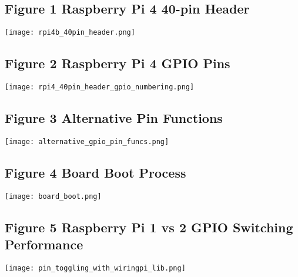\documentclass[journal]{IEEEtran}
\begin{document}
      \subsection{Figure 1 Raspberry Pi 4 40-pin Header}

      \texttt{[image: rpi4b\_40pin\_header.png]}

      \subsection{Figure 2 Raspberry Pi 4 GPIO Pins}

      \texttt{[image: rpi4\_40pin\_header\_gpio\_numbering.png]}

      \subsection{Figure 3 Alternative Pin Functions}

      \texttt{[image: alternative\_gpio\_pin\_funcs.png]}

      \subsection{Figure 4 Board Boot Process}

      \texttt{[image: board\_boot.png]}

      \subsection{Figure 5 Raspberry Pi 1 vs 2 GPIO Switching Performance}

      \texttt{[image: pin\_toggling\_with\_wiringpi\_lib.png]}
    
\end{document}
